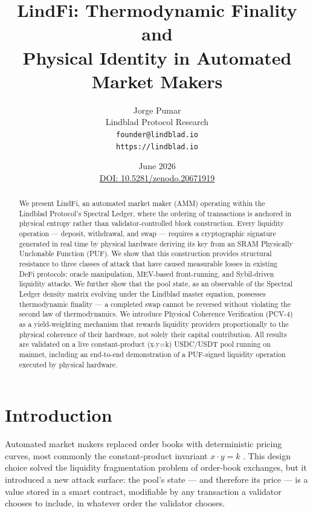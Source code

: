 \documentclass[11pt,a4paper]{article}
\title{\textbf{LindFi: Thermodynamic Finality and\\Physical Identity in Automated Market Makers}}
\author{
    Jorge Pumar\\
    Lindblad Protocol Research\\
    \texttt{founder@lindblad.io}\\
    \texttt{https://lindblad.io}
}
\date{June 2026\\
\small \href{https://doi.org/10.5281/zenodo.20671919}{DOI: 10.5281/zenodo.20671919}}
\begin{document}
\maketitle

\begin{abstract}
We present LindFi, an automated market maker (AMM) operating within the Lindblad Protocol's Spectral Ledger, where the ordering of transactions is anchored in physical entropy rather than validator-controlled block construction. Every liquidity operation --- deposit, withdrawal, and swap --- requires a cryptographic signature generated in real time by physical hardware deriving its key from an SRAM Physically Unclonable Function (PUF). We show that this construction provides structural resistance to three classes of attack that have caused measurable losses in existing DeFi protocols: oracle manipulation, MEV-based front-running, and Sybil-driven liquidity attacks. We further show that the pool state, as an observable of the Spectral Ledger density matrix evolving under the Lindblad master equation, possesses thermodynamic finality --- a completed swap cannot be reversed without violating the second law of thermodynamics. We introduce Physical Coherence Verification (PCV-4) as a yield-weighting mechanism that rewards liquidity providers proportionally to the physical coherence of their hardware, not solely their capital contribution. All results are validated on a live constant-product (x$\cdot$y=k) USDC/USDT pool running on mainnet, including an end-to-end demonstration of a PUF-signed liquidity operation executed by physical hardware.
\end{abstract}

\tableofcontents
\newpage

\section{Introduction}

Automated market makers replaced order books with deterministic pricing curves, most commonly the constant-product invariant $x \cdot y = k$ \cite{uniswap}. This design choice solved the liquidity fragmentation problem of order-book exchanges, but it introduced a new attack surface: the pool's state --- and therefore its price --- is a value stored in a smart contract, modifiable by any transaction a validator chooses to include, in whatever order the validator chooses.
\end{document}

